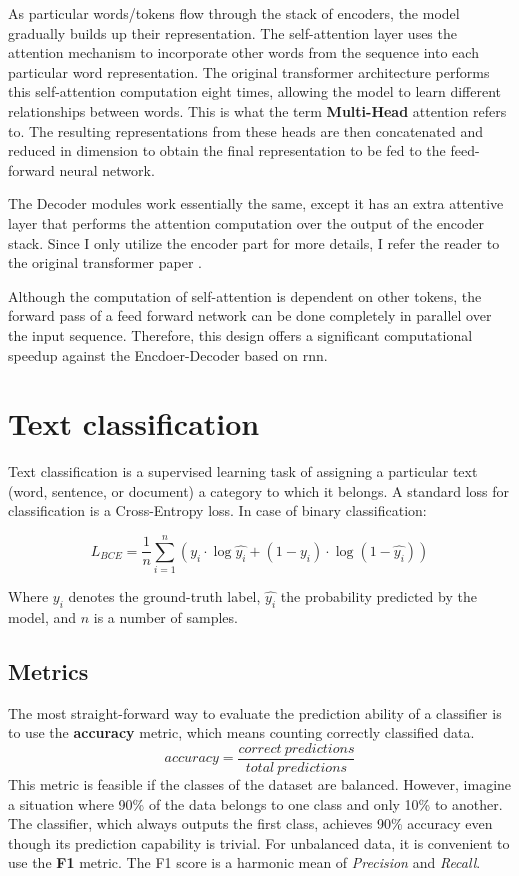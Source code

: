 As particular words/tokens flow through the stack of encoders, the model gradually builds up their representation. The self-attention layer uses the attention mechanism to incorporate other words from the sequence into each particular word representation. The original transformer architecture performs this self-attention computation eight times, allowing the model to learn different relationships between words. This is what the term \textbf{Multi-Head} attention refers to. The resulting representations from these heads are then concatenated and reduced in dimension to obtain the final representation to be fed to the feed-forward neural network. 

The Decoder modules work essentially the same, except it has an extra attentive layer that performs the attention computation over the output of the encoder stack. Since I only utilize the encoder part for more details, I refer the reader to the original transformer paper \cite{vaswani2017attention}.

Although the computation of self-attention is dependent on other tokens, the forward pass of a feed forward network can be done completely in parallel over the input sequence. Therefore, this design offers a significant computational speedup against the Encdoer-Decoder based on \gls{rnn}.




\section{Text classification}
Text classification is a supervised learning task of assigning a particular text (word, sentence, or document) a category to which it belongs. A standard loss for classification is a Cross-Entropy loss. In case of binary classification:

\begin{equation}
    L_{BCE} = \frac{1}{n} \sum_{i=1}^n ( y_i \cdot \log\hat{y_i} + (1-y_i)\cdot\log(1-\hat{y_i}))
\end{equation}

Where $y_i$ denotes the ground-truth label, $\hat{y_i}$ the probability predicted by the model, and $n$ is a number of samples.


    
\subsection{Metrics}
The most straight-forward way to evaluate the prediction ability of a classifier is to use the \textbf{accuracy} metric, which means counting correctly classified data. 
\begin{equation}
    accuracy = \frac{correct\ predictions}{total\ predictions}
\end{equation}
This metric is feasible if the classes of the dataset are balanced. However, imagine a situation where 90\% of the data belongs to one class and only 10\% to another. The classifier, which always outputs the first class, achieves 90\% accuracy even though its prediction capability is trivial. For unbalanced data, it is convenient to use the \textbf{F1} metric. The F1 score is a harmonic mean of \textit{Precision} and \textit{Recall}.

